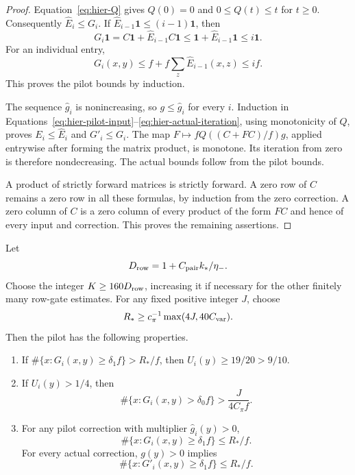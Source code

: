 \begin{proof}
Equation~\eqref{eq:hier-Q} gives $Q(0)=0$ and
$0\leq Q(t)\leq t$ for $t\ge0$.
Consequently $\widehat E_i\leq G_i$.  If
$\widehat E_{i-1}\mathbf 1\leq(i-1)\mathbf 1$, then
\[
 G_i\mathbf 1=C\mathbf 1+\widehat E_{i-1}C\mathbf 1
       \leq\mathbf 1+\widehat E_{i-1}\mathbf 1
       \leq i\mathbf 1.
\]
For an individual entry,
\[
 G_i(x,y)\leq f+f\sum_z\widehat E_{i-1}(x,z)\leq if.
\]
This proves the pilot bounds by induction.

The sequence $\widehat g_i$ is nonincreasing, so
$g\leq\widehat g_i$ for every $i$.  Induction in
Equations~\eqref{eq:hier-pilot-input}--\eqref{eq:hier-actual-iteration},
using monotonicity of $Q$, proves $E_i\leq\widehat E_i$ and
$G'_i\leq G_i$.  The map
$F\mapsto fQ((C+FC)/f)g$, applied entrywise after forming the matrix
product, is monotone.  Its iteration from zero is therefore
nondecreasing.  The actual bounds follow from the pilot bounds.

A product of strictly forward matrices is strictly forward.  A zero row
of $C$ remains a zero row in all these formulas, by induction from the
zero correction.  A zero column of $C$ is a zero column of every product
of the form $FC$ and hence of every input and correction.  This proves
the remaining assertions.
\end{proof}

\begin{lemma}
\label{lem:hier-column-test}
Let
\[
 D_{\rm row}=1+C_{\rm pair}k_*/\eta_-.
\]
Choose the integer $K\geq160D_{\rm row}$, increasing it if necessary
for the other finitely many row-gate estimates.  For any fixed positive
integer $J$, choose
\begin{equation}
 R_*\geq c_\pi^{-1}\max(4J,40C_{\rm var}).
 \label{eq:hier-column-constants}
\end{equation}
Then the pilot has the following properties.
\begin{enumerate}
\item If
$\#\{x:G_i(x,y)\geq\delta_1f\}>R_*/f$, then
$U_i(y)\geq19/20>9/10$.
\item If $U_i(y)>1/4$, then
\[
 \#\{x:G_i(x,y)>\delta_0f\}
       >\frac{J}{4C_\pi f}.
\]
\item For any pilot correction with multiplier
$\widehat g_i(y)>0$,
\[
 \#\{x:G_i(x,y)\geq\delta_1f\}\leq R_*/f.
\]
For every actual correction, $g(y)>0$ implies
\[
 \#\{x:G'_i(x,y)\geq\delta_1f\}\leq R_*/f.
\]
\end{enumerate}
\end{lemma}

